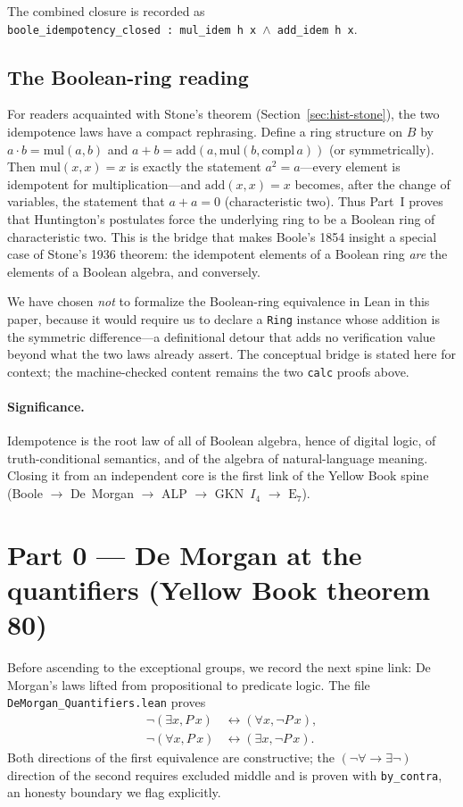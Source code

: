 \documentclass[11pt]{article}
\theoremstyle{definition}
\newcommand{\Iq}{I_4}
\newcommand{\Eseven}{\mathrm{E}_7}
\begin{document}
The combined closure is recorded as
\texttt{boole\_idempotency\_closed~:~mul\_idem~h~x~$\land$~add\_idem~h~x}.

\subsection{The Boolean-ring reading}
\label{sec:boole-ring}

For readers acquainted with Stone's theorem (Section~\ref{sec:hist-stone}), the
two idempotence laws have a compact rephrasing. Define a ring structure on $B$
by $a\cdot b = \mathrm{mul}(a,b)$ and $a+b = \mathrm{add}(a,\mathrm{mul}(b,\mathrm{compl}\,a))$
(or symmetrically). Then $\mathrm{mul}(x,x)=x$ is exactly the statement
$a^2=a$---every element is idempotent for multiplication---and
$\mathrm{add}(x,x)=x$ becomes, after the change of variables, the statement
that $a+a=0$ (characteristic two). Thus Part~I proves that Huntington's
postulates force the underlying ring to be a Boolean ring of characteristic
two. This is the bridge that makes Boole's 1854 insight a special case of
Stone's 1936 theorem: the idempotent elements of a Boolean ring \emph{are} the
elements of a Boolean algebra, and conversely.

We have chosen \emph{not} to formalize the Boolean-ring equivalence in Lean in
this paper, because it would require us to declare a \texttt{Ring} instance
whose addition is the symmetric difference---a definitional detour that adds no
verification value beyond what the two laws already assert. The conceptual
bridge is stated here for context; the machine-checked content remains the two
\texttt{calc} proofs above.

\paragraph{Significance.}
Idempotence is the root law of all of Boolean algebra, hence of digital logic,
of truth-conditional semantics, and of the algebra of natural-language
meaning. Closing it from an independent core is the first link of the Yellow
Book spine (Boole $\to$ De~Morgan $\to$ ALP $\to$ GKN~$\Iq$ $\to$ $\Eseven$).

\section{Part 0 --- De Morgan at the quantifiers (Yellow Book theorem 80)}
\label{sec:demorgan}

Before ascending to the exceptional groups, we record the next spine link: De
Morgan's laws lifted from propositional to predicate logic. The file
\texttt{DeMorgan\_Quantifiers.lean} proves
\begin{align*}
\neg(\exists x, P\,x) &\leftrightarrow (\forall x, \neg P\,x),\\
\neg(\forall x, P\,x) &\leftrightarrow (\exists x, \neg P\,x).
\end{align*}
Both directions of the first equivalence are constructive; the
$(\neg\forall \to \exists\neg)$ direction of the second requires excluded
middle and is proven with \texttt{by\_contra}, an honesty boundary we flag
explicitly.
\end{document}
